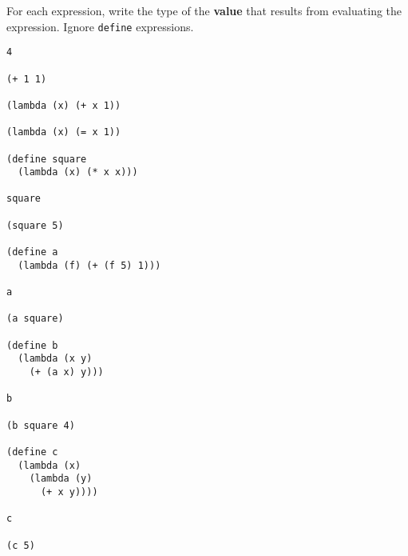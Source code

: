 For each expression, write the type of the {\bf value} that results
from evaluating the expression.  Ignore {\tt define} expressions.
\begin{verbatim}
4

(+ 1 1)

(lambda (x) (+ x 1))

(lambda (x) (= x 1))

(define square
  (lambda (x) (* x x)))

square

(square 5)

(define a
  (lambda (f) (+ (f 5) 1)))

a

(a square)

(define b
  (lambda (x y)
    (+ (a x) y)))

b

(b square 4)

(define c
  (lambda (x)
    (lambda (y)
      (+ x y))))

c

(c 5)
\end{verbatim}


